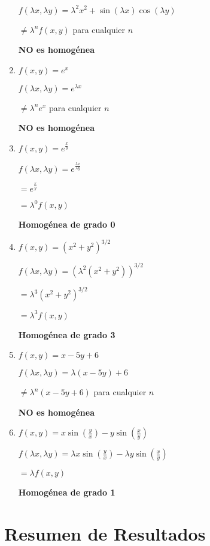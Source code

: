 \documentclass[a4paper,12pt]{article}
\begin{document}
\begin{enumerate}
    $f(\lambda x, \lambda y) = \lambda^2 x^2 + \sin(\lambda x)\cos(\lambda y)$
    
    $\neq \lambda^n f(x,y)$ para cualquier $n$
    
    \textbf{NO es homogénea}

    \item $f(x,y) = e^x$
    
    $f(\lambda x, \lambda y) = e^{\lambda x}$
    
    $\neq \lambda^n e^x$ para cualquier $n$
    
    \textbf{NO es homogénea}

    \item $f(x,y) = e^{\frac{x}{y}}$
    
    $f(\lambda x, \lambda y) = e^{\frac{\lambda x}{\lambda y}}$
    
    $= e^{\frac{x}{y}}$
    
    $= \lambda^0 f(x,y)$
    
    \textbf{Homogénea de grado 0}

    \item $f(x,y) = (x^2 + y^2)^{3/2}$
    
    $f(\lambda x, \lambda y) = (\lambda^2(x^2 + y^2))^{3/2}$
    
    $= \lambda^3(x^2 + y^2)^{3/2}$
    
    $= \lambda^3 f(x,y)$
    
    \textbf{Homogénea de grado 3}

    \item $f(x,y) = x - 5y + 6$
    
    $f(\lambda x, \lambda y) = \lambda(x - 5y) + 6$
    
    $\neq \lambda^n(x - 5y + 6)$ para cualquier $n$
    
    \textbf{NO es homogénea}

    \item $f(x,y) = x\sin\left(\frac{y}{x}\right) - y\sin\left(\frac{x}{y}\right)$
    
    $f(\lambda x, \lambda y) = \lambda x\sin\left(\frac{y}{x}\right) - \lambda y\sin\left(\frac{x}{y}\right)$
    
    $= \lambda f(x,y)$
    
    \textbf{Homogénea de grado 1}
\end{enumerate}

\section*{Resumen de Resultados}
\end{document}
